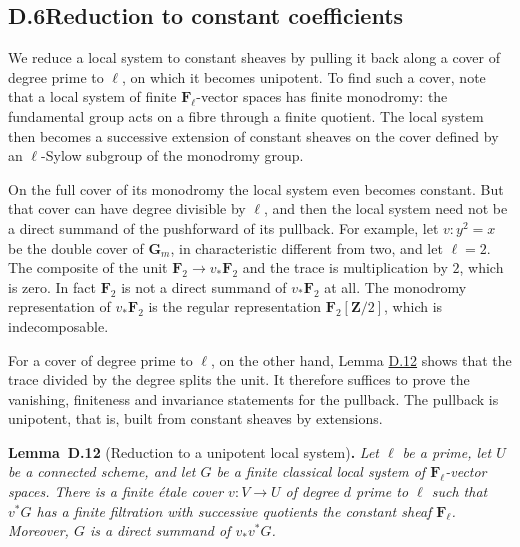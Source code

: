 \documentclass[11pt]{article}
\newenvironment{bpstatement}[2]{\par\addvspace{0.6\baselineskip}\noindent\textbf{#1}#2\textbf{.}\enspace\ignorespaces}
  {\par\addvspace{0.4\baselineskip}}
\newenvironment{bpstatementit}[2]{\begin{bpstatement}{#1}{#2}\itshape\ignorespaces}{\end{bpstatement}}
\begin{document}
\subsection*{\texorpdfstring{D.6\quad Reduction to constant coefficients}{D.6 Reduction to constant coefficients}}
\label{bp213}%
\label{bp214}%
We reduce a local system to constant sheaves by pulling it back along a cover of degree prime to \(\ell\), on which it becomes unipotent. To find such a cover, note that a local system of finite \(\mathbf F_\ell\)-vector spaces has finite monodromy: the fundamental group acts on a fibre through a finite quotient. The local system then becomes a successive extension of constant sheaves on the cover defined by an \(\ell\)-Sylow subgroup of the monodromy group.

On the full cover of its monodromy the local system even becomes constant. But that cover can have degree divisible by \(\ell\), and then the local system need not be a direct summand of the pushforward of its pullback. For example, let \(v:y^2=x\) be the double cover of \(\mathbf G_m\), in characteristic different from two, and let \(\ell=2\). The composite of the unit \(\mathbf F_2\to v_*\mathbf F_2\) and the trace is multiplication by \(2\), which is zero. In fact \(\mathbf F_2\) is not a direct summand of \(v_*\mathbf F_2\) at all. The monodromy representation of \(v_*\mathbf F_2\) is the regular representation \(\mathbf F_2[\mathbf Z/2]\), which is indecomposable.

For a cover of degree prime to \(\ell\), on the other hand, Lemma \hyperref[bp215]{D.12} shows that the trace divided by the degree splits the unit. It therefore suffices to prove the vanishing, finiteness and invariance statements for the pullback. The pullback is unipotent, that is, built from constant sheaves by extensions.

\label{bp215}%
\begin{bpstatementit}{Lemma~D.12}{ (Reduction to a unipotent local system)}
Let \(\ell\) be a prime, let \(U\) be a connected scheme, and let \(G\) be a finite classical local system of \(\mathbf F_\ell\)-vector spaces.  There is a finite étale cover \(v:V\to U\) of degree \(d\) prime to \(\ell\) such that \(v^*G\) has a finite filtration with successive quotients the constant sheaf \(\mathbf F_\ell\).  Moreover, \(G\) is a direct summand of \(v_*v^*G\).
\end{bpstatementit}
\end{document}
